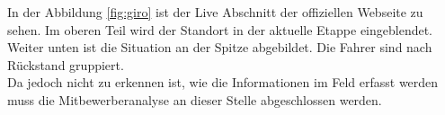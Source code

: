 In der Abbildung \ref{fig:giro} ist der Live Abschnitt der offiziellen Webseite zu sehen. Im oberen Teil wird der Standort in der aktuelle Etappe eingeblendet. Weiter unten ist die Situation an der Spitze abgebildet. Die Fahrer sind nach Rückstand gruppiert.
\\
Da jedoch nicht zu erkennen ist, wie die Informationen im Feld erfasst werden muss die Mitbewerberanalyse an dieser Stelle abgeschlossen werden.